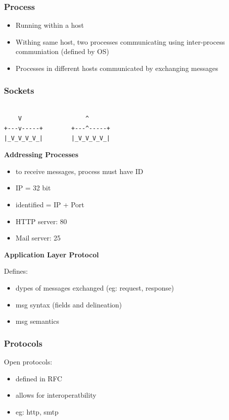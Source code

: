 \documentclass[11pt]{article}
\begin{document}
\subsubsection{Process}
\label{sec:orgd2bfd1d}
\begin{itemize}
\item Running within a host
\item Withing same host, two processes communicating using inter-process
communiation (defined by OS)
\item Processes in different hosts communicated by exchanging messages
\end{itemize}

\subsubsection{Sockets}
\label{sec:org3b358a4}

\begin{verbatim}

    V                  ^
+---v-----+        +---^-----+  
|_V_V_V_V_|        |_V_V_V_V_|

\end{verbatim}

\textbf{Addressing Processes}
\begin{itemize}
\item to receive messages, process must have ID
\item IP = 32 bit
\item identified = IP + Port
\item HTTP server: 80
\item Mail server: 25
\end{itemize}

\textbf{Application Layer Protocol}

Defines:
\begin{itemize}
\item dypes of messages exchanged (eg: request, response)
\item msg syntax (fields and delineation)
\item msg semantics
\end{itemize}

\subsubsection{Protocols}
\label{sec:orgc1d9073}

Open protocols:
\begin{itemize}
\item defined in RFC
\item allows for interoperatbility
\item eg: http, smtp
\end{itemize}
\end{document}
